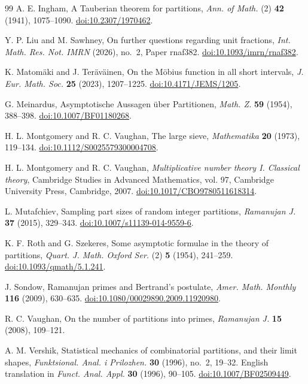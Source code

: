 \documentclass[11pt]{amsart}
\theoremstyle{remark}
\begin{document}
\begin{thebibliography}{99}
A. E. Ingham, A Tauberian theorem for partitions,
\emph{Ann. of Math.} (2) \textbf{42} (1941), 1075--1090.
\href{https://doi.org/10.2307/1970462}{doi:10.2307/1970462}.

Y. P. Liu and M. Sawhney, On further questions regarding unit fractions,
\emph{Int. Math. Res. Not. IMRN} (2026), no.~2, Paper rnaf382.
\href{https://doi.org/10.1093/imrn/rnaf382}{doi:10.1093/imrn/rnaf382}.

K. Matom\"aki and J. Ter\"av\"ainen, On the M\"obius function in all short intervals,
\emph{J. Eur. Math. Soc.} \textbf{25} (2023), 1207--1225.
\href{https://doi.org/10.4171/JEMS/1205}{doi:10.4171/JEMS/1205}.

G. Meinardus, Asymptotische Aussagen \"uber Partitionen,
\emph{Math. Z.} \textbf{59} (1954), 388--398.
\href{https://doi.org/10.1007/BF01180268}{doi:10.1007/BF01180268}.

H. L. Montgomery and R. C. Vaughan, The large sieve,
\emph{Mathematika} \textbf{20} (1973), 119--134.
\href{https://doi.org/10.1112/S0025579300004708}{doi:10.1112/S0025579300004708}.

H. L. Montgomery and R. C. Vaughan,
\emph{Multiplicative number theory I. Classical theory},
Cambridge Studies in Advanced Mathematics, vol. 97, Cambridge University Press, Cambridge, 2007.
\href{https://doi.org/10.1017/CBO9780511618314}{doi:10.1017/CBO9780511618314}.

L. Mutafchiev, Sampling part sizes of random integer partitions,
\emph{Ramanujan J.} \textbf{37} (2015), 329--343.
\href{https://doi.org/10.1007/s11139-014-9559-6}{doi:10.1007/s11139-014-9559-6}.

K. F. Roth and G. Szekeres, Some asymptotic formulae in the theory of partitions,
\emph{Quart. J. Math. Oxford Ser.} (2) \textbf{5} (1954), 241--259.
\href{https://doi.org/10.1093/qmath/5.1.241}{doi:10.1093/qmath/5.1.241}.

J. Sondow, Ramanujan primes and Bertrand's postulate,
\emph{Amer. Math. Monthly} \textbf{116} (2009), 630--635.
\href{https://doi.org/10.1080/00029890.2009.11920980}{doi:10.1080/00029890.2009.11920980}.

R. C. Vaughan, On the number of partitions into primes,
\emph{Ramanujan J.} \textbf{15} (2008), 109--121.

A. M. Vershik, Statistical mechanics of combinatorial partitions, and their limit shapes,
\emph{Funktsional. Anal. i Prilozhen.} \textbf{30} (1996), no.~2, 19--32.
English translation in \emph{Funct. Anal. Appl.} \textbf{30} (1996), 90--105.
\href{https://doi.org/10.1007/BF02509449}{doi:10.1007/BF02509449}.

\end{thebibliography}
\end{document}
